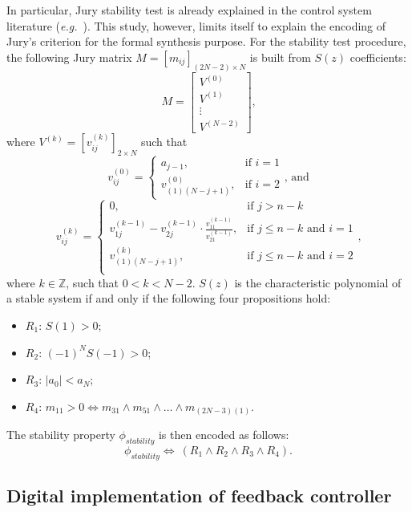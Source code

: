 \documentclass[runningheads,a4paper]{llncs}
\begin{document}
In particular, Jury stability test is already explained in the control system 
literature ({\it e.g.}~\cite{fadali}). This study, however, limits itself to 
explain the encoding of Jury's criterion for the formal synthesis purpose. 
For the stability  test procedure, the following Jury matrix 
$M=[m_{ij}]_{(2N-2)\times N}$ is built  from $S(z)$ coefficients:
$$
M=\left[
\begin{matrix}
  V^{(0)} \\
  V^{(1)} \\
  \vdots \\
  V^{(N-2)}
 \end{matrix}
\right]\mbox{,}
$$
\noindent where $V^{(k)}=[v^{(k)}_{ij}]_{2\times N}$ such that
$$
v^{(0)}_{ij}=\begin{cases} 
a_{j-1}, & \mbox{if } i=1 \\   v^{(0)}_{(1)(N-j+1)}, & \mbox{if } i=2 
\end{cases}\mbox{, and} 
$$
$$
v^{(k)}_{ij}=\begin{cases} 
0, & \mbox{if } j>n-k\\
v^{(k-1)}_{1j}-v^{(k-1)}_{2j}\cdot\frac{v^{(k-1)}_{11}}{v^{(k-1)}_{21}}, & \mbox{if } j\leq n-k  \mbox{ and } i=1 \\
v^{(k)}_{(1)(N-j+1)}, & \mbox{if } j\leq n-k \mbox{ and } i=2 \\
\end{cases} \mbox{,}
$$
\noindent where $k\in\mathbb{Z}$, such that $0<k<N-2$. $S(z)$ is the 
characteristic polynomial of a stable system if and only if the following 
four propositions hold:
\begin{itemize}
\item $R_{1}$: $S(1)>0$;
\item $R_{2}$: $(-1)^{N}S(-1)>0$;
\item $R_{3}$: $\vert{a_{0}}\vert <a_{N}$;
\item $R_{4}$: $m_{11}>0\iff m_{31}\wedge m_{51}\wedge \dots \wedge m_{(2N-3)(1)}$.
\end{itemize}

The stability property $\phi_{stability}$ is then encoded as follows:
$$
\phi_{stability}\iff \ (R_{1} \wedge R_{2} \wedge R_{3} \wedge R_{4}).
$$



\subsection{Digital implementation of feedback controller}
\label{ssec:quantizationerror}
\end{document}
